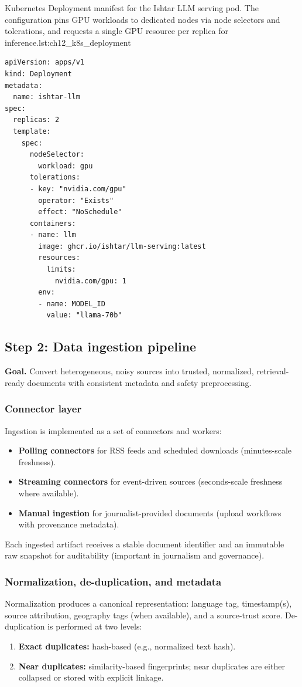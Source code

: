 \begin{codebox}{Kubernetes Deployment manifest for the Ishtar LLM serving pod. The configuration pins GPU workloads to dedicated nodes via node selectors and tolerations, and requests a single GPU resource per replica for inference.}{lst:ch12_k8s_deployment}
\begin{verbatim}
apiVersion: apps/v1
kind: Deployment
metadata:
  name: ishtar-llm
spec:
  replicas: 2
  template:
    spec:
      nodeSelector:
        workload: gpu
      tolerations:
      - key: "nvidia.com/gpu"
        operator: "Exists"
        effect: "NoSchedule"
      containers:
      - name: llm
        image: ghcr.io/ishtar/llm-serving:latest
        resources:
          limits:
            nvidia.com/gpu: 1
        env:
        - name: MODEL_ID
          value: "llama-70b"
\end{verbatim}
\end{codebox}

\subsection{Step 2: Data ingestion pipeline}
\label{sec:ishtar-step-ingestion}

\textbf{Goal.} Convert heterogeneous, noisy sources into trusted, normalized, retrieval-ready documents with consistent metadata and safety preprocessing.

\subsubsection{Connector layer}
Ingestion is implemented as a set of connectors and workers:
\begin{itemize}
    \item \textbf{Polling connectors} for RSS feeds and scheduled downloads (minutes-scale freshness).
    \item \textbf{Streaming connectors} for event-driven sources (seconds-scale freshness where available).
    \item \textbf{Manual ingestion} for journalist-provided documents (upload workflows with provenance metadata).
\end{itemize}

Each ingested artifact receives a stable document identifier and an immutable raw snapshot for auditability (important in journalism and governance).

\subsubsection{Normalization, de-duplication, and metadata}
Normalization produces a canonical representation: language tag, timestamp(s), source attribution, geography tags (when available), and a source-trust score.
De-duplication is performed at two levels:
\begin{enumerate}
    \item \textbf{Exact duplicates:} hash-based (e.g., normalized text hash).
    \item \textbf{Near duplicates:} similarity-based fingerprints; near duplicates are either collapsed or stored with explicit linkage.
\end{enumerate}

